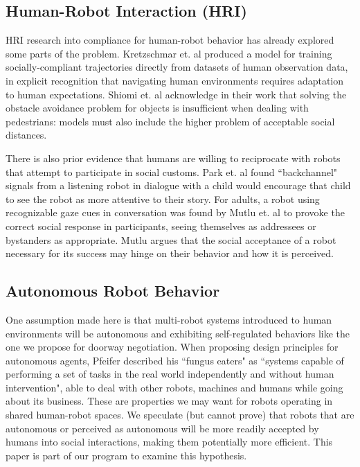 \documentclass[letterpaper, 10 pt, conference]{ieeeconf}  %
\begin{document}
\subsection{Human-Robot Interaction (HRI)}

HRI research into compliance for human-robot behavior has already explored some parts of the problem. Kretzschmar et. al\cite{kretzschmar2016socially} produced a model for training socially-compliant trajectories directly from datasets of human observation data, in explicit recognition that navigating human environments requires adaptation to human expectations. Shiomi et. al\cite{shiomi2014towards} acknowledge in their work that solving the obstacle avoidance problem for objects is insufficient when dealing with pedestrians: models must also include the higher problem of acceptable social distances. 

There is also prior evidence that humans are willing to reciprocate with robots that attempt to participate in social customs. Park et. al\cite{park2017backchannel} found ``backchannel" signals from a listening robot in dialogue with a child would encourage that child to see the robot as more attentive to their story. For adults, a robot using recognizable gaze cues in conversation was found by Mutlu et. al\cite{mutlu2009footing} to provoke the correct social response in participants, seeing themselves as addressees or bystanders as appropriate. Mutlu argues that the social acceptance of a robot necessary for its success may hinge on their behavior and how it is perceived.

\subsection{Autonomous Robot Behavior}

One assumption made here is that multi-robot systems introduced to human environments will be autonomous and exhibiting self-regulated behaviors like the one we propose for doorway negotiation. When proposing design principles for autonomous agents\cite{pfeifer1996building}, Pfeifer described his ``fungus eaters" as ``systems capable of performing a set of tasks in the real world independently and without human intervention", able to deal with other robots, machines and humans while going about its business. These are properties we may want for robots operating in shared human-robot spaces. We speculate (but cannot prove) that robots that are autonomous or perceived as autonomous will be more readily accepted by humans into social interactions, making them potentially more efficient. This paper is part of our program to examine this hypothesis. 
\end{document}

